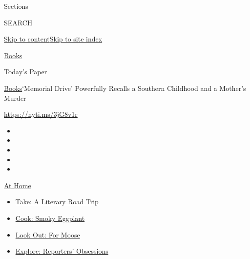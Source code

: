 Sections

SEARCH

\protect\hyperlink{site-content}{Skip to
content}\protect\hyperlink{site-index}{Skip to site index}

\href{https://www.nytimes3xbfgragh.onion/section/books}{Books}

\href{https://myaccount.nytimes3xbfgragh.onion/auth/login?response_type=cookie\&client_id=vi}{}

\href{https://www.nytimes3xbfgragh.onion/section/todayspaper}{Today's
Paper}

\href{/section/books}{Books}\textbar{}`Memorial Drive' Powerfully
Recalls a Southern Childhood and a Mother's Murder

\url{https://nyti.ms/3jG8v1r}

\begin{itemize}
\item
\item
\item
\item
\item
\end{itemize}

\href{https://www.nytimes3xbfgragh.onion/spotlight/at-home?action=click\&pgtype=Article\&state=default\&region=TOP_BANNER\&context=at_home_menu}{At
Home}

\begin{itemize}
\tightlist
\item
  \href{https://www.nytimes3xbfgragh.onion/2020/07/28/books/time-for-a-literary-road-trip.html?action=click\&pgtype=Article\&state=default\&region=TOP_BANNER\&context=at_home_menu}{Take:
  A Literary Road Trip}
\item
  \href{https://www.nytimes3xbfgragh.onion/2020/07/29/magazine/bored-with-your-home-cooking-some-smoky-eggplant-will-fix-that.html?action=click\&pgtype=Article\&state=default\&region=TOP_BANNER\&context=at_home_menu}{Cook:
  Smoky Eggplant}
\item
  \href{https://www.nytimes3xbfgragh.onion/2020/07/27/travel/moose-michigan-isle-royale.html?action=click\&pgtype=Article\&state=default\&region=TOP_BANNER\&context=at_home_menu}{Look
  Out: For Moose}
\item
  \href{https://www.nytimes3xbfgragh.onion/interactive/2020/at-home/even-more-reporters-editors-diaries-lists-recommendations.html?action=click\&pgtype=Article\&state=default\&region=TOP_BANNER\&context=at_home_menu}{Explore:
  Reporters' Obsessions}
\end{itemize}

